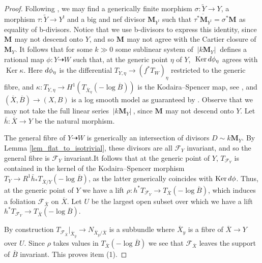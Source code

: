 \documentclass[12pt]{amsart}
\theoremstyle{plain}
\theoremstyle{definition}
\def\ker{\operatorname{Ker}}
\def\bM#1.{\mathbf{M}_{#1}}
\begin{document}
\begin{proof}
Following \cite[\S~2]{Ambro05}, we may find a generically finite morphism 
$\sigma\colon \widetilde{Y} \rightarrow Y$, a morphism $\tau\colon \widetilde{Y} \rightarrow Y^!$ and a big and nef divisor
$\bM Y^!.$ such that $\overline{\tau^*\bM Y^!.} = \sigma^* \bM .$ as equality of b-divisors.
Notice that we use b-divisors to express this identity, since $\bM.$ may not descend onto $Y$, 
and so $\bM.$ may not agree with the Cartier closure of $\bM Y.$.
It follows that for some $k \gg 0$ some sublinear system of 
$~|k \bM Y.|~$ 
defines
a rational map $\phi\colon Y \dashrightarrow W$ such that, at the generic point $\eta$ of $Y$,
	$~\ker {\rm d}\phi_{\eta}$ agrees with $\ker \kappa$. Here ${\rm d}\phi_{\eta}$ is the differential 
	$T_{Y, \eta} \rightarrow (f^*T_W)_\eta$ restricted to the generic fibre, and 
$\kappa\colon T_{Y, \eta} \rightarrow H^1(T_{\overline{X}_\eta}(-\log \overline{B}))$ is the Kodaira--Spencer map, see \cite[Theorem 2.2]{Ambro05}, and 
$(\overline{X}, \overline{B}) \rightarrow (X, B)$
is a log smooth model as guaranteed by \cite[Lemma 1.1]{Ambro05}.
Observe that we may not take the full linear series $~|k \bM Y.|~$, since $\bM.$ may not descend onto $Y$.
Let $\bar{h}\colon \overline{X} \rightarrow Y$
be the natural morphism.


The general fibre of $Y \dashrightarrow W$ is generically an intersection of divisors 
$D \sim k \bM Y.$.
By Lemma \ref{lem_flat_to_isotrivial}, these divisors are all $\mathcal F_Y$
invariant, and so the general fibre is $\mathcal F_Y$ invariant.It follows that at the generic
point of $Y$, $T_{\mathcal F_Y}$ is 
contained in the kernel of the Kodaira--Spencer morphism
$T_{Y} \rightarrow R^1\bar{h}_*T_{\overline{X}/Y}(-\log \overline{B})$,
	as the latter generically coincides with $\ker {\rm d}\phi$.
Thus, at the generic point of $Y$ we have a lift
$\rho\colon h^*T_{\mathcal F_Y} \rightarrow T_{\overline{X}}(-\log \overline{B})$, 
which induces a foliation $\mathcal F_{\overline{X}}$ on $\overline{X}$. Let $U$ be the largest open subset
over which we have a lift $h^*T_{\mathcal F_Y} \rightarrow T_{\overline{X}}(-\log \overline{B})$. 

By construction $T_{\mathcal F_{\overline{X}}}\vert_{\overline{X}_y} \to N_{\overline{X}_y/\overline{X}}$ is a subbundle where $\overline{X}_y$ is a fibre of $\overline{X} \rightarrow Y$ over $U$. Since $\rho$ takes values in 
$T_{\overline{X}}(-\log \overline{B})$ we see that $\mathcal F_{\overline{X}}$ leaves
the support of $\overline{B}$ invariant.
This proves item (1).


\end{proof}
\end{document}
